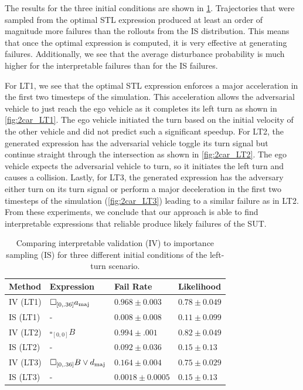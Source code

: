 The results for the three initial conditions are shown in \cref{tab:2car_results}. Trajectories that were sampled from the optimal STL expression produced at least an order of magnitude more failures than the rollouts from the IS distribution. This means that once the optimal expression is computed, it is very effective at generating failures. Additionally, we see that the average disturbance probability is much higher for the interpretable failures than for the IS failures. 

For LT1, we see that the optimal STL expression enforces a major acceleration in the first two timesteps of the simulation. This acceleration allows the adversarial vehicle to just reach the ego vehicle as it completes its left turn as shown in \cref{fig:2car_LT1}. The ego vehicle initiated the turn based on the initial velocity of the other vehicle and did not predict such a significant speedup. For LT2, the generated expression has the adversarial vehicle toggle its turn signal but continue straight through the intersection as shown in \cref{fig:2car_LT2}. The ego vehicle expects the adversarial vehicle to turn, so it initiates the left turn and causes a collision. Lastly, for LT3, the generated expression has the adversary either turn on its turn signal or perform a major deceleration in the first two timesteps of the simulation (\cref{fig:2car_LT3}) leading to a similar failure as in LT2. From these experiments, we conclude that our approach is able to find interpretable expressions that reliable produce likely failures of the SUT.

\begin{table}
    \centering
    \caption{Comparing interpretable validation (IV) to importance sampling (IS) for three different initial conditions of the left-turn scenario.}
    \label{tab:2car_results}
    \begin{tabular}{@{}llll@{}} 
        \toprule
        \textbf{Method} & \textbf{Expression} & \textbf{Fail Rate} & \textbf{Likelihood} \\
        \midrule
        IV (LT1) & $\square_{[0, .36]} a_{\rm maj}$ & $0.968 \pm 0.003$ & $0.78 \pm 0.049$ \\
        IS (LT1) & - &$0.008 \pm 0.008$ & $0.11 \pm 0.099$ \\
        \midrule
        IV (LT2) & $\square_{[0, 0]} B$ & $0.994 \pm .001$ & $0.82 \pm 0.049$ \\
        IS (LT2) & - & $0.092 \pm 0.036$ & $0.15 \pm 0.13$ \\
        \midrule
        IV (LT3) & $\square_{[0, .36]} B \lor d_{\rm maj}$ & $0.164 \pm 0.004$ & $0.75 \pm 0.029$ \\
        IS (LT3) & - & $0.0018 \pm 0.0005$ & $0.15 \pm 0.13$  \\
        \bottomrule
    \end{tabular}
\end{table}


